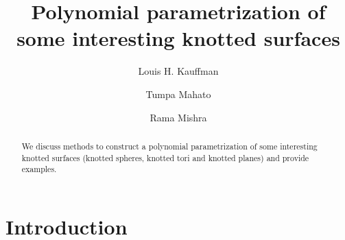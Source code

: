 \documentclass[10pt,a4paper,reqno]{amsart}
\theoremstyle{definition}
\theoremstyle{remark}
\begin{document}
\title[Polynomial parametrization of some interesting knotted surfaces]{Polynomial parametrization of some interesting knotted surfaces}

\author[L. H. Kauffman]{Louis H. Kauffman}
\address{Department of Mathematics, Statistics and Computer Science \\ 
	University of Illinois at Chicago \\ 
	851 South Morgan Street\\
	Chicago, IL, 60607-7045}

\author[T. MAHATO]{Tumpa Mahato}
\address{Department of Mathematics\\Indian Institute of Science Education and Research Pune, Dr. Homi Bhaba Road, Pune, Maharashtra, 411008, India.}

\author[R. Mishra]{Rama Mishra}
\address{Department of Mathematics\\Indian Institute of Science Education and Research Pune, Dr. Homi Bhaba Road, Pune, Maharashtra, 411008, India.}



\makeatletter
{}
\makeatother
{}










\begin{abstract}
	We discuss methods to construct a polynomial parametrization of some interesting knotted surfaces (knotted spheres, knotted tori and knotted planes) and provide examples.
\end{abstract}
\maketitle

\section{Introduction} 
\end{document}
